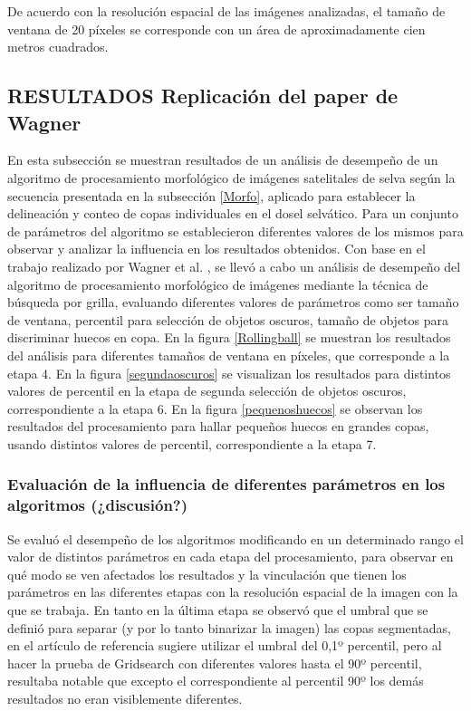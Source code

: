 

De acuerdo con la resolución espacial de las imágenes analizadas, el tamaño de ventana de 20 píxeles se corresponde con un área de aproximadamente cien metros cuadrados.
\subsection{RESULTADOS Replicación del paper de Wagner}
En esta subsección se muestran resultados de un análisis de desempeño de un algoritmo de procesamiento morfológico de imágenes satelitales de selva según la secuencia presentada en la subsección \ref{Morfo}, aplicado para establecer la delineación y conteo de copas individuales en el dosel selvático. Para un conjunto de parámetros del algoritmo se establecieron diferentes valores de los mismos para observar y analizar la influencia en los resultados obtenidos.
Con base en el trabajo realizado por Wagner et al. \cite{hubert_wagner_individual_2018}, se llevó a cabo un análisis de desempeño del algoritmo de procesamiento morfológico de imágenes mediante la técnica de búsqueda por grilla, evaluando diferentes valores de parámetros como ser tamaño de ventana, percentil para selección de objetos oscuros, tamaño de objetos para discriminar huecos en copa. En la figura \ref{Rollingball} se muestran los resultados del análisis para diferentes tamaños de ventana en  píxeles, que corresponde a la etapa 4. En la figura \ref{segundaoscuros} se visualizan los resultados para distintos valores de percentil en la etapa de segunda selección de objetos oscuros, correspondiente a la etapa 6. En la figura \ref{pequenoshuecos} se observan los resultados del procesamiento para hallar pequeños huecos en grandes copas, usando distintos valores de percentil, correspondiente a la etapa 7. 



\subsubsection{Evaluación de la influencia de diferentes parámetros en los algoritmos (¿discusión?)}
Se evaluó el desempeño de los algoritmos modificando en un determinado rango el valor de distintos parámetros en cada etapa del procesamiento, para observar en qué modo se ven afectados los resultados y la vinculación que tienen los parámetros en las diferentes etapas con la resolución espacial de la imagen con la que se trabaja. En tanto en la última etapa se observó que el umbral
que se definió para separar (y por lo tanto binarizar la imagen) las copas segmentadas, en el artículo de referencia sugiere utilizar el umbral del 0,1º percentil, pero al hacer la prueba de Gridsearch con diferentes valores hasta el 90º percentil, resultaba notable que excepto el correspondiente al percentil 90º los demás resultados no eran visiblemente
diferentes.



